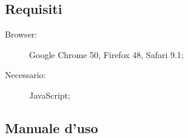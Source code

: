 \documentclass[../manuale-utente.tex]{subfiles}
\begin{document}
\subsection{Requisiti}%
\label{sub:requisiti}

\begin{description}
    \item[Browser:] Google Chrome 50, Firefox 48, Safari 9.1;
    \item[Necessario:] JavaScript;
\end{description}


\subsection{Manuale d'uso}%
\label{sub:manuale-duso-web}
\end{document}
